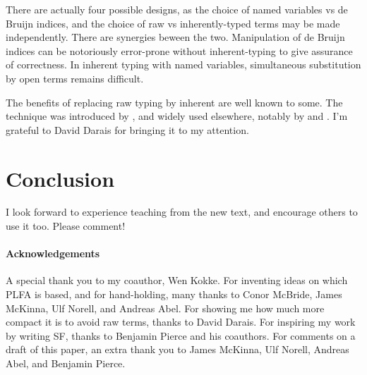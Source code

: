 \documentclass[runningheads]{llncs}
\begin{document}
There are actually four possible designs, as the choice of named
variables vs de Bruijn indices, and the choice of raw vs
inherently-typed terms may be made independently.  There are synergies
beween the two.  Manipulation of de Bruijn indices can be notoriously
error-prone without inherent-typing to give assurance of correctness.
In inherent typing with named variables, simultaneous substitution by
open terms remains difficult.

The benefits of replacing raw typing by inherent are well
known to some. The technique was introduced by
\citet{Altenkirch-and-Reus-1999}, and widely used elsewhere,
notably by \citet{Chapman-2009} and \citet{Allais-et-al-2017}.
I'm grateful to David Darais for bringing it to my attention.


\section{Conclusion}

I look forward to experience teaching from the new text,
and encourage others to use it too.  Please comment!


\paragraph{Acknowledgements}

A special thank you to my coauthor, Wen Kokke.  For inventing ideas on
which PLFA is based, and for hand-holding, many thanks to Conor
McBride, James McKinna, Ulf Norell, and Andreas Abel.  For showing me
how much more compact it is to avoid raw terms, thanks to David
Darais.  For inspiring my work by writing SF, thanks to Benjamin
Pierce and his coauthors.  For comments on a draft of this paper, an
extra thank you to James McKinna, Ulf Norell, Andreas Abel, and
Benjamin Pierce.


%

\end{document}
